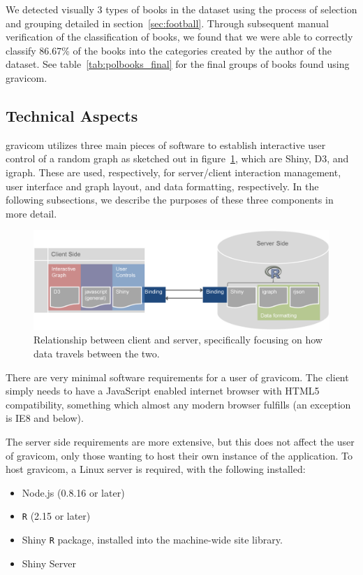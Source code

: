 \documentclass{article}\usepackage[]{graphicx}\usepackage[]{color}
\begin{document}
We detected visually 3 types of books in the dataset using the process of selection and grouping detailed in section~\ref{sec:football}. Through subsequent manual verification of the classification of books, we found that we were able to correctly classify 86.67\% of the books into the categories created by the author of the dataset. See table~\ref{tab:polbooks_final} for the final groups of books found using gravicom.


\subsection{Technical Aspects}

gravicom utilizes three main pieces of software to establish interactive user control of a random graph as sketched out in figure~\ref{fig:clientserver}, which are Shiny, D3, and igraph. These are used, respectively, for server/client interaction management, user interface and graph layout, and data formatting, respectively. In the following subsections, we describe the purposes of these three components in more detail.

\begin{figure}[H]
\centering
\includegraphics[width=\textwidth]{images/clientserverflow.png}
\caption{\label{fig:clientserver} Relationship between client and server, specifically focusing on how data travels between the two.}
\end{figure}

There are very minimal software requirements for a user of gravicom. The client simply needs to have a JavaScript enabled internet browser with HTML5 compatibility, something which almost any modern browser fulfills (an exception is IE8 and below). 

The server side requirements are more extensive, but this does not affect the user of gravicom, only those wanting to host their own instance of the application. To host gravicom, a Linux server is required, with the following installed:

\begin{itemize}
\item Node.js (0.8.16 or later)
\item {\tt R} (2.15 or later)
\item Shiny {\tt R} package, installed into the machine-wide site library. 
\item Shiny Server
\end{itemize}
\end{document}
